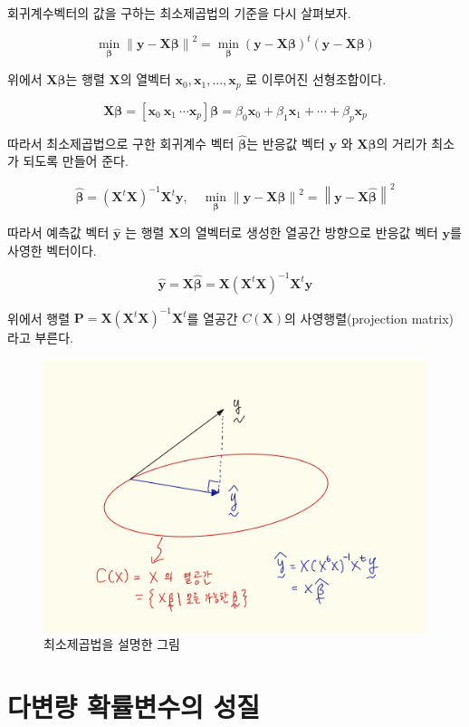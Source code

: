\documentclass[
]{book}
\newcommand{\norm}[1]{\left\lVert#1\right\rVert}
\theoremstyle{definition}
\theoremstyle{definition}
\theoremstyle{definition}
\theoremstyle{remark}
\begin{document}
회귀계수벡터의 값을 구하는 최소제곱법의 기준을 다시 살펴보자.

\[   \min_{\bm \beta } \norm{\bm y -  \bm X \bm \beta }^2= \min_{\bm \beta } ( \bm y -  \bm X \bm \beta )^t( \bm y -  \bm X \bm \beta )  \]

위에서 \(\bm X \bm \beta\)는 행렬 \(\bm X\)의 열벡터 \(\bm x_0, \bm x_1, \dots, \bm x_p\) 로 이루어진 선형조합이다.

\[ \bm X \bm \beta = [\bm x_0~\bm x_1~ \cdots \bm x_p]\bm \beta
 = \beta_0 \bm x_0  + \beta_1 \bm x_1 + \cdots + \beta_p \bm x_p \]

따라서 최소제곱법으로 구한 회귀계수 벡터 \(\hat {\bm \beta}\)는 반응값 벡터 \(\bm y\) 와 \(\bm X {\bm \beta}\)의 거리가 최소가 되도록 만들어 준다.

\[ \hat {\bm \beta} = (\bm X^t \bm X)^{-1} \bm X^t \bm y, \quad 
 \min_{\bm \beta } \norm{\bm y -  \bm X \bm \beta }^2 = \norm{\bm y -  \bm X \hat {\bm \beta} }^2
 \]

따라서 예측값 벡터 \(\hat {\bm y}\) 는 행렬 \(\bm X\)의 열벡터로 생성한 열공간 방향으로 반응값 벡터 \(\bm y\)를 사영한 벡터이다.

\[ \hat {\bm y} = \bm X \hat {\bm \beta} = \bm  X(\bm X^t \bm X)^{-1} \bm X^t \bm y \]

위에서 행렬 \(\bm P = \bm X(\bm X^t \bm X)^{-1} \bm X^t\)를 열공간 \(C(\bm X)\)의 사영행렬(projection matrix)라고 부른다.

\begin{figure}
\centering
\includegraphics{proj2.png}
\caption{최소제곱법을 설명한 그림}
\end{figure}

\hypertarget{mulivar}{%
\chapter{다변량 확률변수의 성질}\label{mulivar}}
\end{document}
